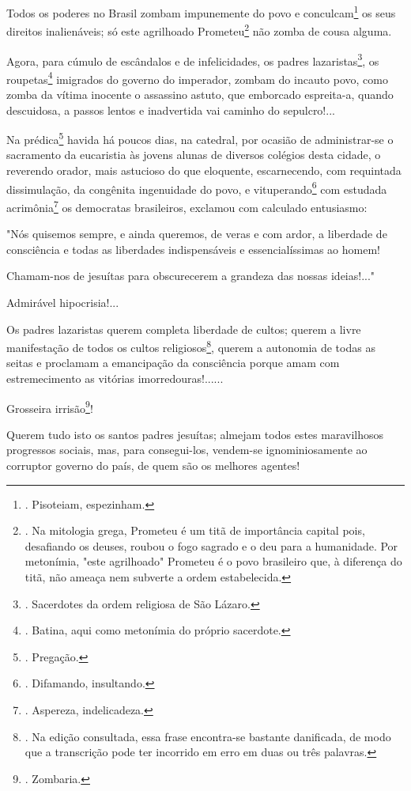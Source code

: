 Todos os poderes no Brasil zombam impunemente do povo e
conculcam\footnote{. Pisoteiam, espezinham.} os seus direitos
inalienáveis; só este agrilhoado Prometeu\footnote{. Na mitologia grega,
  Prometeu é um titã de importância capital pois, desafiando os deuses,
  roubou o fogo sagrado e o deu para a humanidade. Por metonímia, "este
  agrilhoado" Prometeu é o povo brasileiro que, à diferença do titã, não
  ameaça nem subverte a ordem estabelecida.} não zomba de cousa alguma.

Agora, para cúmulo de escândalos e de infelicidades, os padres
lazaristas\footnote{. Sacerdotes da ordem religiosa de São Lázaro.}, os
roupetas\footnote{. Batina, aqui como metonímia do próprio sacerdote.}
imigrados do governo do imperador, zombam do incauto povo, como zomba da
vítima inocente o assassino astuto, que emborcado espreita-a, quando
descuidosa, a passos lentos e inadvertida vai caminho do sepulcro!...

Na prédica\footnote{. Pregação.} havida há poucos dias, na catedral, por
ocasião de administrar-se o sacramento da eucaristia às jovens alunas de
diversos colégios desta cidade, o reverendo orador, mais astucioso do
que eloquente, escarnecendo, com requintada dissimulação, da congênita
ingenuidade do povo, e vituperando\footnote{. Difamando, insultando.}
com estudada acrimônia\footnote{. Aspereza, indelicadeza.} os democratas
brasileiros, exclamou com calculado entusiasmo:

"Nós quisemos sempre, e ainda queremos, de veras e com ardor, a
liberdade de consciência e todas as liberdades indispensáveis e
essencialíssimas ao homem!

Chamam-nos de jesuítas para obscurecerem a grandeza das nossas
ideias!..."

Admirável hipocrisia!...

Os padres lazaristas querem completa liberdade de cultos; querem a livre
manifestação de todos os cultos religiosos\footnote{. Na edição
  consultada, essa frase encontra-se bastante danificada, de modo que a
  transcrição pode ter incorrido em erro em duas ou três palavras.},
querem a autonomia de todas as seitas e proclamam a emancipação da
consciência porque amam com estremecimento as vitórias
imorredouras!......

Grosseira irrisão\footnote{. Zombaria.}!

Querem tudo isto os santos padres jesuítas; almejam todos estes
maravilhosos progressos sociais, mas, para consegui-los, vendem-se
ignominiosamente ao corruptor governo do país, de quem são os melhores
agentes!

